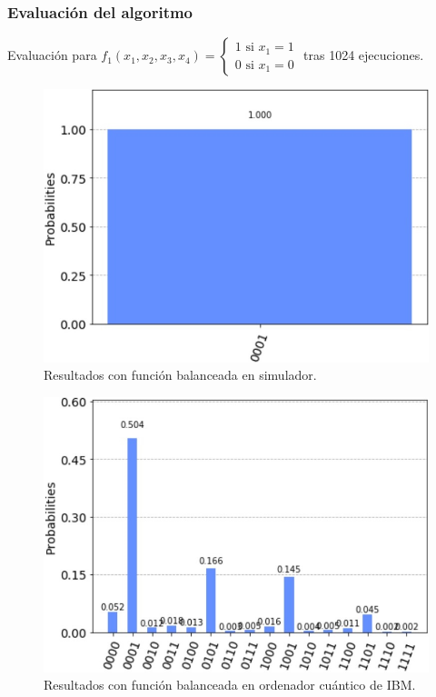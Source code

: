 \documentclass{beamer}
\begin{document}
\begin{frame}
\frametitle{Evaluación del algoritmo}
Evaluación para $f_1(x_1,x_2,x_3,x_4)=\left\{\begin{matrix}1\textrm{ si } x_1=1\\0\textrm{ si } x_1=0\end{matrix}\right.$ tras 1024 ejecuciones. 
\begin{figure}[htb!]
    \centering
    \begin{minipage}{0.45\textwidth}
        \centering
        \includegraphics[width=1\textwidth]{../tex/images/simulator_balanced}
        Resultados con función balanceada en simulador.
    \end{minipage}\hfill
    \begin{minipage}{0.45\textwidth}
        \centering
        \includegraphics[width=1\textwidth]{../tex/images/ibmq_balanced}
        Resultados con función balanceada en ordenador cuántico de IBM.
    \end{minipage}
\end{figure}
\end{frame}
\end{document}
